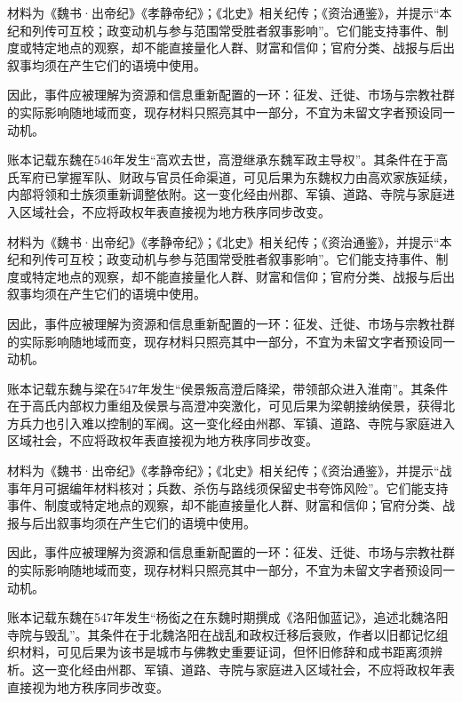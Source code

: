 材料为《魏书·出帝纪》《孝静帝纪》；《北史》相关纪传；《资治通鉴》，并提示“本纪和列传可互校；政变动机与参与范围常受胜者叙事影响”。它们能支持事件、制度或特定地点的观察，却不能直接量化人群、财富和信仰；官府分类、战报与后出叙事均须在产生它们的语境中使用。

因此，事件应被理解为资源和信息重新配置的一环：征发、迁徙、市场与宗教社群的实际影响随地域而变，现存材料只照亮其中一部分，不宜为未留文字者预设同一动机。

账本记载东魏在546年发生“高欢去世，高澄继承东魏军政主导权”。其条件在于高氏军府已掌握军队、财政与官员任命渠道，可见后果为东魏权力由高欢家族延续，内部将领和士族须重新调整依附。这一变化经由州郡、军镇、道路、寺院与家庭进入区域社会，不应将政权年表直接视为地方秩序同步改变。

材料为《魏书·出帝纪》《孝静帝纪》；《北史》相关纪传；《资治通鉴》，并提示“本纪和列传可互校；政变动机与参与范围常受胜者叙事影响”。它们能支持事件、制度或特定地点的观察，却不能直接量化人群、财富和信仰；官府分类、战报与后出叙事均须在产生它们的语境中使用。

因此，事件应被理解为资源和信息重新配置的一环：征发、迁徙、市场与宗教社群的实际影响随地域而变，现存材料只照亮其中一部分，不宜为未留文字者预设同一动机。

账本记载东魏与梁在547年发生“侯景叛高澄后降梁，带领部众进入淮南”。其条件在于高氏内部权力重组及侯景与高澄冲突激化，可见后果为梁朝接纳侯景，获得北方兵力也引入难以控制的军阀。这一变化经由州郡、军镇、道路、寺院与家庭进入区域社会，不应将政权年表直接视为地方秩序同步改变。

材料为《魏书·出帝纪》《孝静帝纪》；《北史》相关纪传；《资治通鉴》，并提示“战事年月可据编年材料核对；兵数、杀伤与路线须保留史书夸饰风险”。它们能支持事件、制度或特定地点的观察，却不能直接量化人群、财富和信仰；官府分类、战报与后出叙事均须在产生它们的语境中使用。

因此，事件应被理解为资源和信息重新配置的一环：征发、迁徙、市场与宗教社群的实际影响随地域而变，现存材料只照亮其中一部分，不宜为未留文字者预设同一动机。

账本记载东魏在547年发生“杨衒之在东魏时期撰成《洛阳伽蓝记》，追述北魏洛阳寺院与毁乱”。其条件在于北魏洛阳在战乱和政权迁移后衰败，作者以旧都记忆组织材料，可见后果为该书是城市与佛教史重要证词，但怀旧修辞和成书距离须辨析。这一变化经由州郡、军镇、道路、寺院与家庭进入区域社会，不应将政权年表直接视为地方秩序同步改变。

